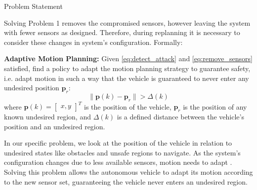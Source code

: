 \begin{section}{Problem Statement}
\begin{problem}
\end{problem}
Solving Problem 1 removes the compromised sensors, however leaving the system with fewer sensors as designed. Therefore, during replanning it is necessary to consider these changes in system's configuration. Formally:
	
\begin{problem} \label{problem2} {\textbf{Adaptive Motion Planning:}}
Given \eqref{eq:detect_attack} and \eqref{eq:remove_sensors} satisfied, find a policy to adapt the motion planning strategy  to guarantee safety, i.e. adapt motion in such a way that the vehicle is guaranteed to never enter any undesired position $\bm{p}_r$:  
	\begin{equation}
		\lVert {\bm{p}(k)-\bm{p}_r} \rVert >\Delta(k)
	\end{equation}
where $\bm{p}(k)={\begin{bmatrix} x,y \end{bmatrix}}^T$ is the position of the vehicle, $\bm{p}_r$ is the position of any known undesired region, and $\Delta(k)$ is a defined distance between the vehicle's position and an undesired region.
	\end{problem}

In our specific problem, we look at the position of the vehicle in relation to undesired states like obstacles and unsafe regions to navigate. As the system's configuration changes due to less available sensors, motion needs to adapt . Solving this problem allows the autonomous vehicle to adapt its motion according to the new sensor set, guaranteeing the vehicle never enters an undesired region.
\end{section}